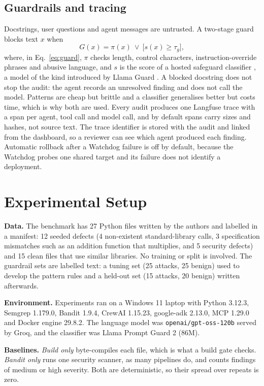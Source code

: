 \documentclass[12pt,onecolumn,draftclsnofoot]{IEEEtran}
\begin{document}
\subsection{Guardrails and tracing}
Docstrings, user questions and agent messages are untrusted. A two-stage guard blocks text $x$ when
\begin{equation}
 G(x)=\pi(x)\ \lor\ \bigl[s(x)\ge\tau_g\bigr],
 \label{eq:guard}
\end{equation}
where, in Eq.~\eqref{eq:guard}, $\pi$ checks length, control characters, instruction-override phrases and abusive language, and $s$ is the score of a hosted safeguard classifier \cite{promptguard}, a model of the kind introduced by Llama Guard \cite{inan2023}. A blocked docstring does not stop the audit: the agent records an unresolved finding and does not call the model. Patterns are cheap but brittle and a classifier generalises better but costs time, which is why both are used. Every audit produces one Langfuse trace with a span per agent, tool call and model call, and by default spans carry sizes and hashes, not source text. The trace identifier is stored with the audit and linked from the dashboard, so a reviewer can see which agent produced each finding. Automatic rollback after a Watchdog failure is off by default, because the Watchdog probes one shared target and its failure does not identify a deployment.

\section{Experimental Setup}
\textbf{Data.} The benchmark has 27 Python files written by the authors and labelled in a manifest: 12 seeded defects (4 non-existent standard-library calls, 3 specification mismatches such as an addition function that multiplies, and 5 security defects) and 15 clean files that use similar libraries. No training or split is involved. The guardrail sets are labelled text: a tuning set (25 attacks, 25 benign) used to develop the pattern rules and a held-out set (15 attacks, 20 benign) written afterwards.

\textbf{Environment.} Experiments ran on a Windows 11 laptop with Python 3.12.3, Semgrep 1.179.0, Bandit 1.9.4, CrewAI 1.15.23, google-adk 2.13.0, MCP 1.29.0 and Docker engine 29.8.2. The language model was \texttt{openai/gpt-oss-120b} served by Groq, and the classifier was Llama Prompt Guard 2 (86M).

\textbf{Baselines.} \emph{Build only} byte-compiles each file, which is what a build gate checks. \emph{Bandit only} runs one security scanner, as many pipelines do, and counts findings of medium or high severity. Both are deterministic, so their spread over repeats is zero.
\end{document}
